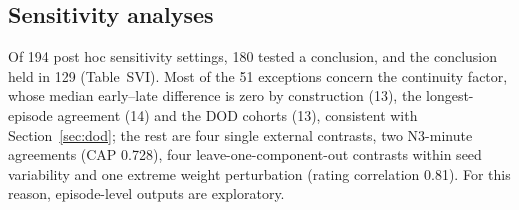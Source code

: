 \subsection{Sensitivity analyses}
Of 194 post hoc sensitivity settings, 180 tested a conclusion, and the conclusion held in 129 (Table~SVI). Most of the 51 exceptions concern the continuity factor, whose median early--late difference is zero by construction (13), the longest-episode agreement (14) and the DOD cohorts (13), consistent with Section~\ref{sec:dod}; the rest are four single external contrasts, two N3-minute agreements (CAP 0.728), four leave-one-component-out contrasts within seed variability and one extreme weight perturbation (rating correlation 0.81). For this reason, episode-level outputs are exploratory. %
